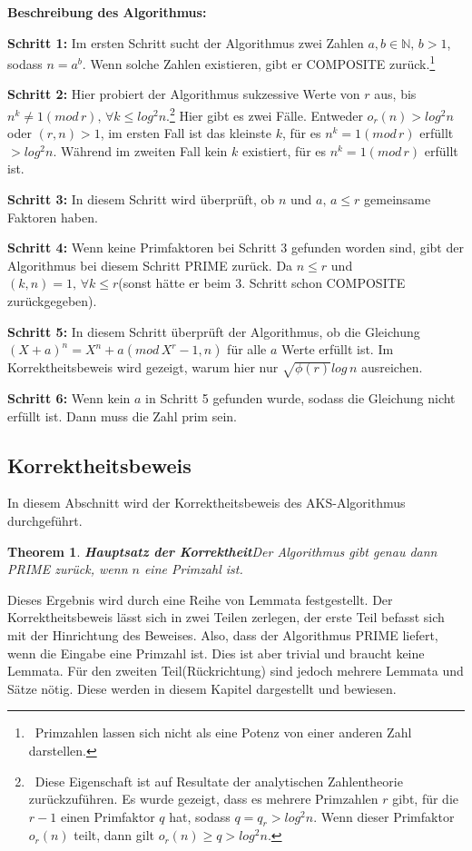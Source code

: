 \documentclass[12pt,oneside]{article}
\newtheorem{theorem}{Theorem}[section]
\theoremstyle{remark}
\theoremstyle{definition}
\begin{document}
\textbf{Beschreibung des Algorithmus:}\newline

\textbf{Schritt 1: }Im ersten Schritt sucht der Algorithmus zwei Zahlen $a,b \in \mathbb{N}, \, b > 1$, sodass $n = a^b$. Wenn solche Zahlen existieren, gibt er COMPOSITE zurück.\footnote{$\,$ Primzahlen lassen sich nicht als eine Potenz von einer anderen Zahl darstellen.}  

\textbf{Schritt 2: }Hier probiert der Algorithmus sukzessive Werte von $r$ aus, bis $n^k \neq 1 (mod \, r), \, \forall k \leq log^2 n$.\footnote{$\,$ Diese Eigenschaft ist auf Resultate  der analytischen Zahlentheorie zurückzuführen. Es wurde gezeigt, dass es mehrere Primzahlen $r$ gibt, für die $r - 1$ einen Primfaktor $q$ hat, sodass $q = q_r > log^2n$. Wenn dieser Primfaktor $o_r(n)$ teilt, dann gilt $o_r(n) \geq q  > log^2 n$\cite{and-gar}.} Hier gibt es zwei Fälle. Entweder $o_r(n) > log^2 n$ oder $(r,n) > 1$, im ersten Fall ist das kleinste $k$, für es $n^k =  1 (mod \, r)$ erfüllt $ > log^2n$. Während im zweiten Fall kein $k$ existiert, für es $n^k = 1 (mod \, r)$ erfüllt ist.  

\textbf{Schritt 3: }In diesem Schritt wird überprüft, ob $n$ und $a, \, a \leq r$ gemeinsame Faktoren haben. 

\textbf{Schritt 4: } Wenn keine Primfaktoren bei Schritt 3 gefunden worden sind, gibt der Algorithmus bei diesem Schritt PRIME zurück. Da $n \leq r$ und $(k,n) = 1, \, \forall k \leq r $(sonst hätte er beim 3. Schritt schon COMPOSITE zurückgegeben).

\textbf{Schritt 5: } In diesem Schritt überprüft der Algorithmus, ob die Gleichung $(X+a)^n = X^n + a (mod \, X^r - 1,n)$ für alle $a$ Werte erfüllt ist. Im Korrektheitsbeweis wird gezeigt, warum hier nur $\sqrt{\phi(r)} log \, n$ ausreichen.

\textbf{Schritt 6: } Wenn kein $a$ in Schritt 5 gefunden wurde, sodass die Gleichung nicht erfüllt ist. Dann muss die Zahl prim sein. 
\newpage

\subsection{Korrektheitsbeweis}

In diesem Abschnitt wird der Korrektheitsbeweis des AKS-Algorithmus durchgeführt. 

\begin{theorem}
\textbf{Hauptsatz der Korrektheit}\newline Der Algorithmus gibt genau dann PRIME zurück, wenn $n$ eine Primzahl ist.
\end{theorem}
Dieses Ergebnis wird durch eine Reihe von Lemmata festgestellt. Der Korrektheitsbeweis lässt sich in zwei Teilen zerlegen, der erste Teil befasst sich mit der Hinrichtung des Beweises. Also, dass der Algorithmus PRIME liefert, wenn die Eingabe eine Primzahl ist. Dies ist aber trivial und braucht keine Lemmata. Für den zweiten Teil(Rückrichtung) sind jedoch mehrere Lemmata und Sätze nötig. Diese werden in diesem Kapitel dargestellt und bewiesen.
\end{document}
